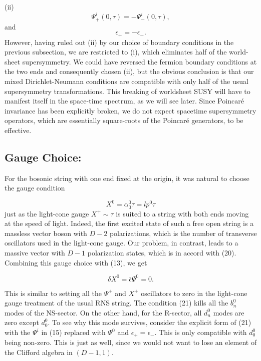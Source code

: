 \documentclass[a4paper,a4paper]{article}
\begin{document}
(ii)
\begin{equation}
\Psi_{+}^{i}(0,\tau)=-\Psi_{-}^{i}(0,\tau),
\end{equation}
and
\begin{equation}
\epsilon_{+}=-\epsilon_{-}.
\end{equation}
However, having ruled out (ii) by our choice of boundary
conditions in the previous subsection, we are restricted to (i),
which eliminates half of the world-sheet supersymmetry.  We could
have reversed the fermion boundary conditions at the two ends and
consequently chosen (ii), but the obvious conclusion is that our
mixed Dirichlet-Neumann conditions are compatible with only half
of the usual supersymmetry transformations.  This breaking of
worldsheet SUSY will have to manifest itself in the space-time
spectrum, as we will see later.  Since Poincar\'{e} invariance has
been explicitly broken, we do not expect spacetime supersymmetry
operators, which are essentially square-roots of the Poincar\'{e}
generators, to be effective.

\subsection{Gauge Choice:}

For the bosonic string with one end fixed at the origin, it was
natural to choose the gauge condition

\begin{equation}
X^{0}=\alpha_{0}^{0}\tau =lp^0 \tau
\end{equation}
just as the light-cone gauge $X^{+}\sim\tau$ is suited to a string
with both ends moving at the speed of light.  Indeed, the first
excited state of such a free open string is a massless vector
boson with $D-2$ polarizations, which is the number of transverse
oscillators used in the light-cone gauge. Our problem, in
contrast, leads to a massive vector with $D-1$ polarization
states, which is in accord with (20). Combining this gauge choice
with (13), we get

\begin{equation} \delta X^{0}=\bar{\epsilon} \Psi^{0}=0.
\end{equation}

This is similar to setting all the $\Psi^{+}$ and $X^{+}$
oscillators to zero in the light-cone gauge treatment of the usual
RNS string.  The condition (21) kills all the $b_{n}^{0}$ modes of
the NS-sector.  On the other hand, for the R-sector, all
$d_{n}^{0}$ modes are zero except $d_{0}^{0}$. To see why this mode
survives, consider the explicit form of (21) with the $\Psi ^i$ in
(15) replaced with $\Psi ^0$ and $\epsilon_+ = \epsilon_-$.  This
is only compatible with $d_{0}^{0}$ being non-zero.  This is just
as well, since we would not want to lose an element of the
Clifford algebra in $(D-1,1)$.
\end{document}
